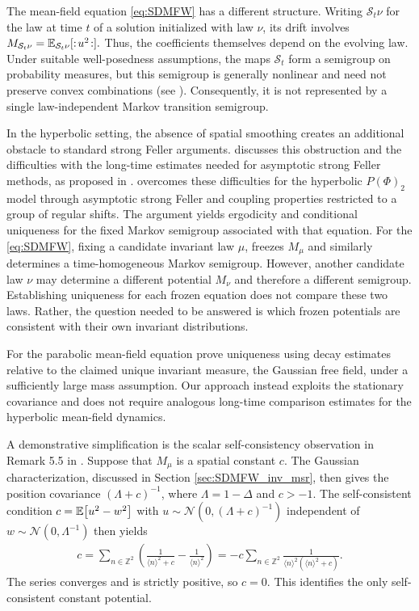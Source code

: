 The mean-field equation \eqref{eq:SDMFW} has a different
structure. Writing $\mathcal{S}_t\nu$ for the law at time $t$
of a solution initialized with law $\nu$, its drift involves
$
    M_{\mathcal{S}_t\nu}
    =
    \mathbb{E}_{\mathcal{S}_t\nu}[:\! u^2 \!:].
$
Thus, the coefficients themselves depend on the evolving law.
Under suitable well-posedness assumptions, the maps $\mathcal{S}_t$ form a semigroup on probability measures, but this semigroup is generally nonlinear and need not preserve convex combinations (see \cite{RehmeierRockner2025}). Consequently, it is not represented by a single law-independent Markov transition semigroup.

In the hyperbolic setting, the absence of spatial smoothing creates an additional obstacle to standard strong Feller arguments. \cite{Tolomeo2023Ergodicity} discusses this obstruction and the difficulties with the long-time estimates needed for asymptotic strong Feller methods, as proposed in \cite{Hairer2006}.
\cite{Tolomeo2023Ergodicity} overcomes these difficulties for the hyperbolic $P(\Phi)_2$ model through asymptotic strong Feller and coupling properties restricted to a group of regular shifts.
The argument yields ergodicity and conditional uniqueness for the fixed Markov semigroup associated with that equation.
For the \eqref{eq:SDMFW}, fixing a candidate invariant law $\mu$, freezes $M_\mu$ and similarly determines a time-homogeneous Markov semigroup. However, another candidate law $\nu$ may determine a different potential $M_\nu$ and therefore a different semigroup. Establishing uniqueness for each frozen equation does not compare these two laws. Rather, the question needed to be answered is which frozen potentials are consistent with their own invariant distributions.

For the parabolic mean-field equation \cite{Shen2022} prove uniqueness using decay estimates relative to the claimed unique invariant measure, the Gaussian free field, under a sufficiently large mass assumption. Our approach instead exploits the stationary covariance and does not require analogous long-time comparison estimates for the hyperbolic mean-field dynamics. 

A demonstrative simplification is the scalar self-consistency observation in Remark 5.5 in \cite{Shen2022}.
Suppose that $M_\mu$ is a spatial constant $c$. The Gaussian characterization, discussed in Section \ref{sec:SDMFW_inv_msr}, then gives the position covariance $(\Lambda+c)^{-1}$, where $\Lambda=1-\Delta$ and $c>-1$.
The self-consistent condition $c = \EV{u^2 - w^2}$ with $u  \sim \mathcal{N}(0,(\Lambda+c)^{-1})$ independent of $w \sim \mathcal{N}(0, \Lambda^{-1})$ then yields
\begin{align*}
    c
    =
    \sum_{n\in\mathbb{Z}^2}
    \left(
        \frac{1}{\langle n\rangle^2+c}
        -
        \frac{1}{\langle n\rangle^2}
    \right)
    =
    -c\sum_{n\in\mathbb{Z}^2}
    \frac{1}{
        \langle n\rangle^2
        (\langle n\rangle^2+c)
    }.
\end{align*}
The series converges and is strictly positive, so $c=0$. This identifies the only self-consistent constant potential.

